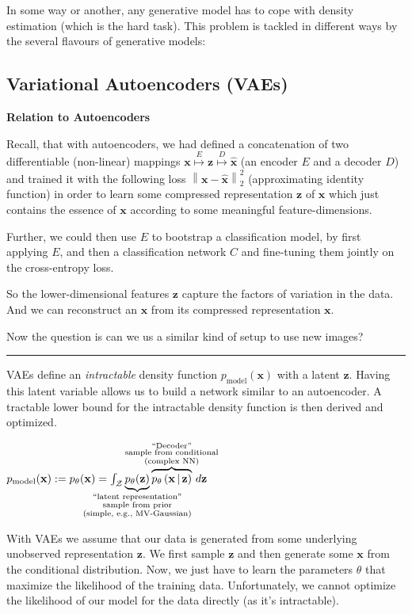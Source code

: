 \documentclass[a2paper,8pt]{extarticle}
\newcommand{\cZ}{\mathcal{Z}}
\newcommand{\norm}[1]{\left\lVert #1 \right\rVert}
\newcommand{\cDist}[3]{#1\left( #2 \,\middle|\, #3 \right)}
\renewcommand{\vec}[1]{\mathbf{#1}}
\newcommand{\vx}{\vec{x}}
\newcommand{\vz}{\vec{z}}
\newcommand{\vhx}{\widehat{\vec{x}}}
\newcommand{\sep}{\vspace{0pt}\noindent\hrule\vspace{0pt}}
\newcommand{\sep}{\vspace{5pt}\noindent\hrule\vspace{5pt}}
\begin{document}
\begin{landscape}
\begin{multicols*}{7}
In some way or another, any generative model has to cope with density
estimation (which is the hard task). This problem is tackled in different
ways by the several flavours of generative models:



\subsection{Variational Autoencoders (VAEs)}

\textbf{Relation to Autoencoders}

Recall, that with autoencoders, we had defined a concatenation of two
differentiable (non-linear) mappings
$\vx\stackrel{E}{\mapsto}\vz\stackrel{D}{\mapsto}\vhx$ (an encoder $E$ and a
decoder $D$) and trained it with the following loss $\norm{\vx-\vhx}_2^2$
(approximating identity function) in order to learn some compressed
representation $\vz$ of $\vx$ which just contains the essence of $\vx$ according
to some meaningful feature-dimensions.

Further, we could then use $E$ to bootstrap a classification model, by first
applying $E$, and then a classification network $C$ and fine-tuning them jointly
on the cross-entropy loss.

So the lower-dimensional features $\vz$ capture the factors of variation in
the data. And we can reconstruct an $\vx$ from its compressed representation
$\vx$.

Now the question is can we us a similar kind of setup to use new images?

\sep

VAEs define an \emph{intractable} density function $p_{\text{model}}(\vx)$ with
a latent $\vz$. Having this latent variable allows us to build a network
similar to an autoencoder. A tractable lower bound for the intractable density
function is then derived and optimized.

$
p_{\text{model}}(\vx):=
p_\theta(\vx)=\int_{\cZ}
\underbrace{p_\theta(\vz)}_{\mathclap{\substack{
\text{``latent representation''}\\
\text{sample from prior}\\
\text{(simple, e.g., MV-Gaussian)}}}}
\overbrace{\cDist{p_\theta}{\vx}{\vz}}^{\mathclap{\substack{
\text{``Decoder''}\\
\text{sample from conditional}\\
\text{(complex NN)}}}} \,d\vz 
$

With VAEs we assume that our data is generated from some underlying unobserved
representation $\vz$. We first sample $\vz$ and then generate some $\vx$ from
the conditional distribution. Now, we just have to learn the parameters $\theta$
that maximize the likelihood of the training data. Unfortunately, we cannot
optimize the likelihood of our model for the data directly (as it's
intractable). 


\end{multicols*}
\end{landscape}
\end{document}
